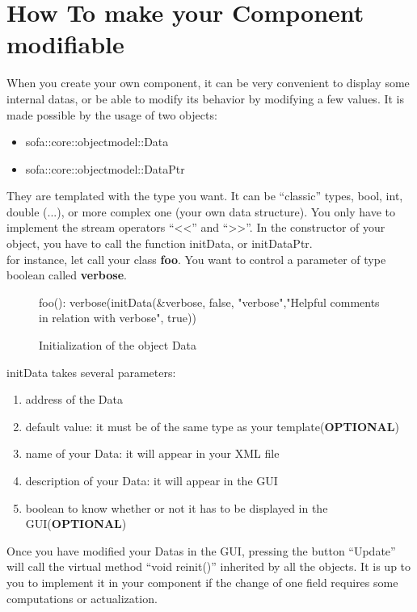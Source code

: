 
\section{How To make your Component modifiable}
When you create your own component, it can be very convenient to display some internal datas, or be able to modify its behavior by modifying a few values. It is made possible by the usage of two objects:
\begin{itemize}
 \item sofa::core::objectmodel::Data
 \item sofa::core::objectmodel::DataPtr
\end{itemize}
They are templated with the type you want. It can be ``classic'' types, bool, int, double (...), or more complex one (your own data structure). You only have to implement the stream operators ``<<'' and ``>>''. In the constructor of your object, you have to call the function initData, or initDataPtr. 
\\
for instance, let call your class  {\bf foo}. You want to control a parameter of type boolean called {\bf verbose}.
\begin{figure}[htpb]
\begin{code_cpp}
     foo(): verbose(initData(&verbose, false, "verbose","Helpful comments in relation with verbose", true))	
{
}
\end{code_cpp}
\caption{Initialization of the object Data}
\end{figure}
initData takes several parameters: 
\begin{enumerate}
 \item address of the Data
 \item default value: it must be of the same type as your template({\bf OPTIONAL})
 \item name of your Data: it will appear in your XML file
 \item description of your Data: it will appear in the GUI
 \item boolean to know whether or not it has to be displayed in the GUI({\bf OPTIONAL})
\end{enumerate}

 Once you have modified your Datas in the GUI, pressing the button ``Update'' will call the virtual method ``void reinit()'' inherited by all the objects. It is up to you to implement it in your component if the change of one field requires some computations or actualization.


